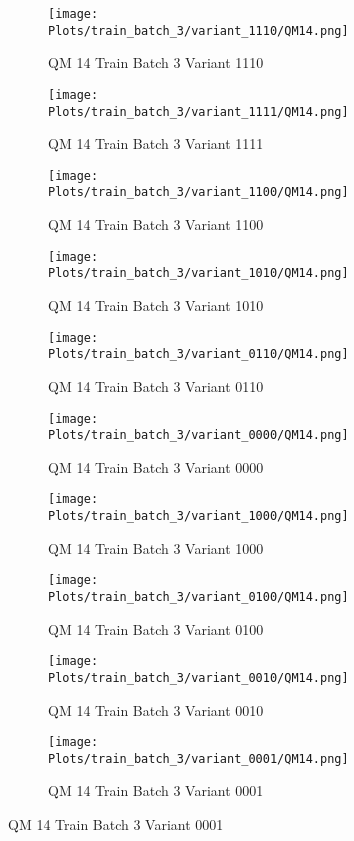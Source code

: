 \documentclass{DissertateFigs}
\begin{document}
\begin{figure}[t!]
    \begin{subfigure}{0.47\textwidth}
    \texttt{[image: Plots/train\_batch\_3/variant\_1110/QM14.png]}
    \caption{QM 14 Train Batch 3 Variant 1110}
    \end{subfigure}
    \begin{subfigure}{0.47\textwidth}
    \texttt{[image: Plots/train\_batch\_3/variant\_1111/QM14.png]}
    \caption{QM 14 Train Batch 3 Variant 1111}
    \end{subfigure}

\medskip

    \begin{subfigure}{0.47\textwidth}
    \texttt{[image: Plots/train\_batch\_3/variant\_1100/QM14.png]}
    \caption{QM 14 Train Batch 3 Variant 1100}
    \end{subfigure}
    \begin{subfigure}{0.47\textwidth}
    \texttt{[image: Plots/train\_batch\_3/variant\_1010/QM14.png]}
    \caption{QM 14 Train Batch 3 Variant 1010}
    \end{subfigure}

\medskip

    \begin{subfigure}{0.47\textwidth}
    \texttt{[image: Plots/train\_batch\_3/variant\_0110/QM14.png]}
    \caption{QM 14 Train Batch 3 Variant 0110}
    \end{subfigure}
    \begin{subfigure}{0.47\textwidth}
    \texttt{[image: Plots/train\_batch\_3/variant\_0000/QM14.png]}
    \caption{QM 14 Train Batch 3 Variant 0000}
    \end{subfigure}

\medskip

    \begin{subfigure}{0.47\textwidth}
    \texttt{[image: Plots/train\_batch\_3/variant\_1000/QM14.png]}
    \caption{QM 14 Train Batch 3 Variant 1000}
    \end{subfigure}
    \begin{subfigure}{0.47\textwidth}
    \texttt{[image: Plots/train\_batch\_3/variant\_0100/QM14.png]}
    \caption{QM 14 Train Batch 3 Variant 0100}
    \end{subfigure}

\medskip

    \begin{subfigure}{0.47\textwidth}
    \texttt{[image: Plots/train\_batch\_3/variant\_0010/QM14.png]}
    \caption{QM 14 Train Batch 3 Variant 0010}
    \end{subfigure}
    \begin{subfigure}{0.47\textwidth}
    \texttt{[image: Plots/train\_batch\_3/variant\_0001/QM14.png]}
    \caption{QM 14 Train Batch 3 Variant 0001}
    \end{subfigure}


\end{figure}
\end{document}
